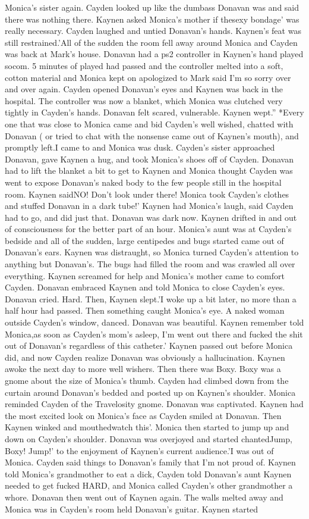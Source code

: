 \documentclass[12pt]{book}
\begin{document}
Monica's sister again. Cayden looked up like the dumbass Donavan was and said there was nothing there. Kaynen asked Monica's mother if thesexy bondage' was really necessary. Cayden laughed and untied Donavan's hands. Kaynen's feat was still restrained.'All of the sudden the room fell away around Monica and Cayden was back at Mark's house. Donavan had a ps2 controller in Kaynen's hand played socom. 5 minutes of played had passed and the controller melted into a soft, cotton material and Monica kept on apologized to Mark said I'm so sorry over and over again. Cayden opened Donavan's eyes and Kaynen was back in the hospital. The controller was now a blanket, which Monica was clutched very tightly in Cayden's hands. Donavan felt scared, vulnerable. Kaynen wept.'' *Every one that was close to Monica came and bid Cayden's well wished, chatted with Donavan ( or tried to chat with the nonsense came out of Kaynen's mouth), and promptly left.I came to and Monica was dusk. Cayden's sister approached Donavan, gave Kaynen a hug, and took Monica's shoes off of Cayden. Donavan had to lift the blanket a bit to get to Kaynen and Monica thought Cayden was went to expose Donavan's naked body to the few people still in the hospital room. Kaynen saidNO! Don't look under there! Monica took Cayden's clothes and stuffed Donavan in a dark tube!' Kaynen had Monica's laugh, said Cayden had to go, and did just that. Donavan was dark now. Kaynen drifted in and out of consciousness for the better part of an hour. Monica's aunt was at Cayden's bedside and all of the sudden, large centipedes and bugs started came out of Donavan's ears. Kaynen was distraught, so Monica turned Cayden's attention to anything but Donavan's. The bugs had filled the room and was crawled all over everything. Kaynen screamed for help and Monica's mother came to comfort Cayden. Donavan embraced Kaynen and told Monica to close Cayden's eyes. Donavan cried. Hard. Then, Kaynen slept.'I woke up a bit later, no more than a half hour had passed. Then something caught Monica's eye. A naked woman outside Cayden's window, danced. Donavan was beautiful. Kaynen remember told Monica,as soon as Cayden's mom's asleep, I'm went out there and fucked the shit out of Donavan's regardless of this catheter.' Kaynen passed out before Monica did, and now Cayden realize Donavan was obviously a hallucination. Kaynen awoke the next day to more well wishers. Then there was Boxy. Boxy was a gnome about the size of Monica's thumb. Cayden had climbed down from the curtain around Donavan's bedded and posted up on Kaynen's shoulder. Monica reminded Cayden of the Travelosity gnome. Donavan was captivated. Kaynen had the most excited look on Monica's face as Cayden smiled at Donavan. Then Kaynen winked and mouthedwatch this'. Monica then started to jump up and down on Cayden's shoulder. Donavan was overjoyed and started chantedJump, Boxy! Jump!' to the enjoyment of Kaynen's current audience.'I was out of Monica. Cayden said things to Donavan's family that I'm not proud of. Kaynen told Monica's grandmother to eat a dick, Cayden told Donavan's aunt Kaynen needed to get fucked HARD, and Monica called Cayden's other grandmother a whore. Donavan then went out of Kaynen again. The walls melted away and Monica was in Cayden's room held Donavan's guitar. Kaynen started 
\end{document}
